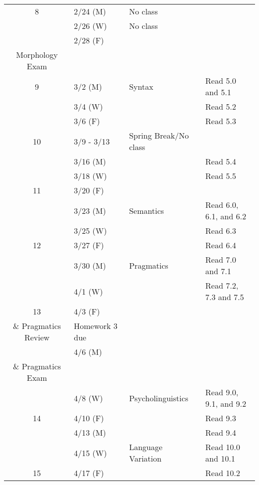 \documentclass{article}
\makeatletter
\newcommand{\cellbreak}[2]{
    \begin{tabular}[t]{@{}l@{}}
      #1\\
      #2
    \end{tabular}}
\makeatother
\begin{document}
\begin{longtable}{c l l l}
      8     & 2/24 (M)    & No class                        & \\
            & 2/26 (W)    & No class                        & \\
            & 2/28 (F)    & \cellbreak{Phonology \&}
                                      {Morphology Exam}     & \\
      9     & 3/2 (M)     & Syntax                          & Read 5.0 and 5.1\\
            & 3/4 (W)     &                                 & Read 5.2\\
            & 3/6 (F)     &                                 & Read 5.3\\
      10    & 3/9 - 3/13  & Spring Break/No class           & \\
            & 3/16 (M)    &                                 & Read 5.4\\
            & 3/18 (W)    &                                 & Read 5.5\\
      11    & 3/20 (F)    &                                 & \\
            & 3/23 (M)    & Semantics                       & Read 6.0, 6.1, and 6.2\\
            & 3/25 (W)    &                                 & Read 6.3\\
      12    & 3/27 (F)    &                                 & Read 6.4\\
            & 3/30 (M)    & Pragmatics                      & Read 7.0 and 7.1\\
            & 4/1 (W)     &                                 & Read 7.2, 7.3 and 7.5\\
      13    & 4/3 (F)     & \cellbreak{Syntax, Semantics}
                                      {\& Pragmatics Review}& Homework 3 due\\
            & 4/6 (M)     & \cellbreak{Syntax, Semantics}
                                      {\& Pragmatics Exam}  & \\
            & 4/8 (W)     & Psycholinguistics               & Read 9.0, 9.1, and 9.2\\
      14    & 4/10 (F)    &                                 & Read 9.3\\
            & 4/13 (M)    &                                 & Read 9.4\\
            & 4/15 (W)    & Language Variation              & Read 10.0 and 10.1\\
      15    & 4/17 (F)    &                                 & Read 10.2\\

\end{longtable}
\end{document}

